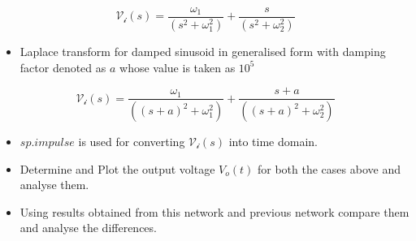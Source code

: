 \documentclass[10pt,a4paper]{article}
\providecommand{\tightlist}{%
      \setlength{\itemsep}{0pt}\setlength{\parskip}{0pt}}
\begin{document}
\begin{equation}
    \mathcal{V_{i}}(s) = \frac{\omega_1}{(s^2 + \omega_1^2)}+ \frac{s}{(s^2 + \omega_2^{2})}
\end{equation}

\begin{itemize}
\tightlist
\item
  Laplace transform for damped sinusoid in generalised form with damping
  factor denoted as \(a\) whose value is taken as \textbf{\(10^{5}\)}
\end{itemize}

\begin{equation}
    \mathcal{V_{i}}(s) = \frac{\omega_1}{((s+a)^2 + \omega_1^2)}+ \frac{s+a}{((s+a)^2 + \omega_2^{2})}
\end{equation}

\begin{itemize}
\item
  \(sp.impulse\) is used for converting \(\mathcal{V_{i}}(s)\) into time
  domain.
\item
  Determine and Plot the output voltage \(V_{o}(t)\) for both the cases
  above and analyse them.
\item
  Using results obtained from this network and previous network compare
  them and analyse the differences.
\end{itemize}
\end{document}
